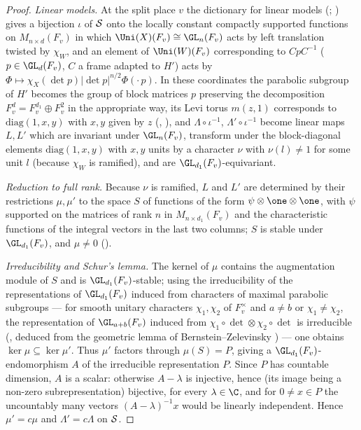 \begin{proof}
\emph{Linear models.} At the split place $v$ the dictionary for linear models
(; ) gives a bijection
$\iota$ of $\mathcal{S}$ onto the locally constant compactly supported functions on $M_{n\times d}(F_v)$ in which
$\Uni(X)(F_v)\cong\GL_n(F_v)$ acts by left translation twisted by $\chi_W$, and an element of $\Uni(W)(F_v)$ corresponding to
$CpC^{-1}$ ($p\in\GL_d(F_v)$, $C$ a frame adapted to $H'$) acts by $\Phi\mapsto\chi_X(\det p)|\det p|^{n/2}\Phi(\cdot\,p)$.
In these coordinates the parabolic subgroup of $H'$ becomes the group of block matrices $p$ preserving the decomposition
$F_v^{d}=F_v^{d_1}\oplus F_v^2$ in the appropriate way, its Levi torus $m(z,1)$ corresponds to $\mathrm{diag}(1,x,y)$ with
$x,y$ given by $z$ (,
), and $\Lambda\circ\iota^{-1}$, $\Lambda'\circ
\iota^{-1}$ become linear maps $L,L'$ which are invariant under $\GL_n(F_v)$, transform under the block-diagonal elements
$\mathrm{diag}(1,x,y)$ with $x,y$ units by a character $\nu$ with $\nu(l)\ne1$ for some unit $l$ (because $\chi_W$ is
ramified), and are $\GL_{d_1}(F_v)$-equivariant.

\emph{Reduction to full rank.} Because $\nu$ is ramified, $L$ and $L'$ are determined by their restrictions $\mu,\mu'$ to
the space $S$ of functions of the form $\psi\otimes\one\otimes\one$, with $\psi$ supported on the matrices of rank $n$ in
$M_{n\times d_1}(F_v)$ and the characteristic functions of the integral vectors in the last two columns; $S$ is stable under
$\GL_{d_1}(F_v)$, and $\mu\ne0$
().

\emph{Irreducibility and Schur's lemma.} The kernel of $\mu$ contains the augmentation module of $S$ and is
$\GL_{d_1}(F_v)$-stable; using the irreducibility of the representations of $\GL_{d_1}(F_v)$ induced from characters of
maximal parabolic subgroups --- for smooth unitary characters $\chi_1,\chi_2$ of $F_v^\times$ and $a\ne b$ or
$\chi_1\ne\chi_2$, the representation of $\GL_{a+b}(F_v)$ induced from $\chi_1\circ\det\otimes\chi_2\circ\det$ is
irreducible (, deduced from the geometric lemma of
Bernstein--Zelevinsky \cite{BernsteinZelevinsky1977,Bernstein1984}) --- one obtains $\ker\mu\subseteq\ker\mu'$. Thus $\mu'$
factors through $\mu(S)=P$, giving a $\GL_{d_1}(F_v)$-endomorphism $A$ of the irreducible representation $P$. Since $P$ has
countable dimension, $A$ is a scalar: otherwise $A-\lambda$ is injective, hence (its image being a non-zero
subrepresentation) bijective, for every $\lambda\in\C$, and for $0\ne x\in P$ the uncountably many vectors
$(A-\lambda)^{-1}x$ would be linearly independent. Hence $\mu'=c\mu$ and $\Lambda'=c\Lambda$ on $\mathcal{S}$.
\end{proof}


